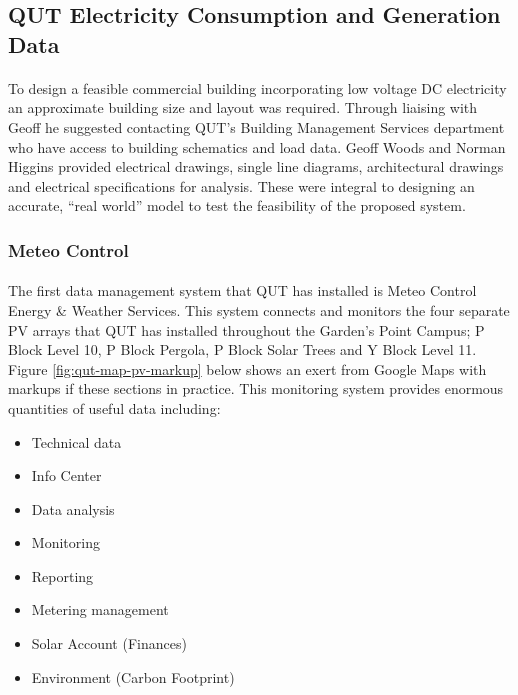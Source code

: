 
\subsection{QUT Electricity Consumption and Generation Data} \label{section:QUT-Data}

\paragraph{}
To design a feasible commercial building incorporating low voltage DC electricity an approximate building size and layout was required. Through liaising with Geoff he suggested contacting QUT's Building Management Services department who have access to building schematics and load data. Geoff Woods and Norman Higgins provided electrical drawings, single line diagrams, architectural drawings and electrical specifications for analysis. These were integral to designing an accurate, ``real world'' model to test the feasibility of the proposed system.

\subsubsection{Meteo Control}

\paragraph{}
The first data management system that QUT has installed is Meteo Control Energy \& Weather Services. This system connects and monitors the four separate PV arrays that QUT has installed throughout the Garden's Point Campus; P Block Level 10, P Block Pergola, P Block Solar Trees and Y Block Level 11. Figure \ref{fig:qut-map-pv-markup} below shows an exert from Google Maps with markups if these sections in practice. This monitoring system provides enormous quantities of useful data including: 

\begin{itemize}[noitemsep,nolistsep]
	\item Technical data 
	\item Info Center
	\item Data analysis
	\item Monitoring
	\item Reporting
	\item Metering management
	\item Solar Account (Finances)
	\item Environment (Carbon Footprint)
\end{itemize} 

